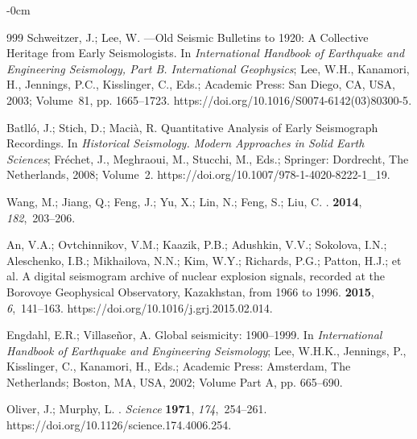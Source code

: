 \documentclass[sensors,article,accept,moreauthors,pdftex]{Definitions/mdpi}
\begin{document}
\begin{adjustwidth}{-\extralength}{0cm}
\begin{thebibliography}{999}
Schweitzer, J.; Lee, W.
---Old Seismic Bulletins to 1920: A Collective Heritage from Early
  Seismologists. In {\em International Handbook of Earthquake and Engineering
  Seismology, Part B. International Geophysics}; Lee, W.H., Kanamori, H., Jennings, P.C., Kisslinger, C.,
  Eds.; Academic Press: San Diego, CA, USA, 2003; Volume~81, pp.
  1665--1723. {https://doi.org/10.1016/S0074-6142(03)80300-5}. %

Batlló, J.; Stich, D.; Macià, R.
\newblock Quantitative Analysis of Early Seismograph Recordings. In {\em
  Historical Seismology. Modern Approaches in Solid Earth Sciences}; Fréchet,
  J., Meghraoui, M., Stucchi, M., Eds.; Springer: Dordrecht, The Netherlands,
  2008; Volume~2. {https://doi.org/10.1007/978-1-4020-8222-1\_19}.

Wang, M.; Jiang, Q.; Feng, J.; Yu, X.; Lin, N.; Feng, S.; Liu, C.
.
 {\bf 2014}, {\em 182},~203--206.

An, V.A.; Ovtchinnikov, V.M.; Kaazik, P.B.; Adushkin, V.V.; Sokolova, I.N.;
  Aleschenko, I.B.; Mikhailova, N.N.; Kim, W.Y.; Richards, P.G.; Patton, H.J.; et al.
\newblock A digital seismogram archive of nuclear explosion signals, recorded
  at the Borovoye Geophysical Observatory, Kazakhstan, from 1966 to 1996.
 {\bf 2015}, {\em 6},~141--163.
\newblock %
{https://doi.org/10.1016/j.grj.2015.02.014}.

Engdahl, E.R.; Villaseñor, A.
\newblock Global seismicity: 1900--1999. In {\em International Handbook of
  Earthquake and Engineering Seismology}; Lee, W.H.K., Jennings, P.,
  Kisslinger, C., Kanamori, H., Eds.; Academic Press: Amsterdam, The Netherlands; Boston, MA, USA,
  2002; Volume Part A, %
pp. 665--690.

Oliver, J.; Murphy, L.
. {\em Science} {\bf 1971}, {\em 174},~254--261.
{https://doi.org/10.1126/science.174.4006.254}.


\end{thebibliography}
\end{adjustwidth}
\end{document}

